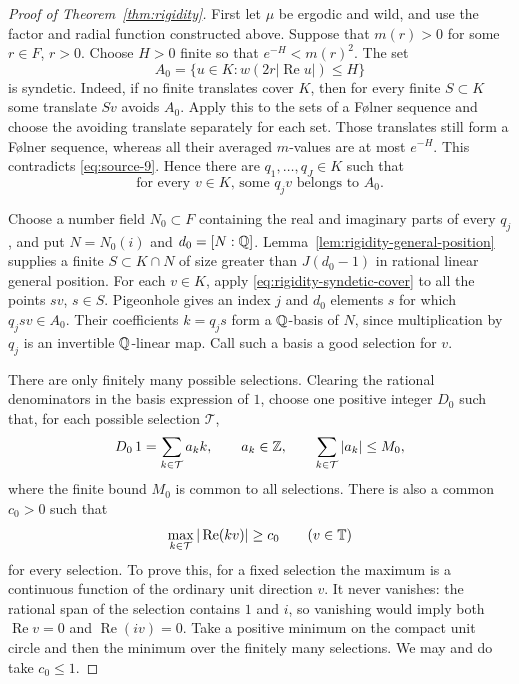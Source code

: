 \begin{proof}[Proof of Theorem~\ref{thm:rigidity}]
First let $\mu$ be ergodic and wild, and use the factor and radial
function constructed above.  Suppose that $m(r)>0$ for some $r\in F$,
$r>0$.  Choose $H>0$ finite so that $e^{-H}<m(r)^2$.  The set
\[
 A_0=\{u\in K:w(2r|\operatorname{Re}u|)\leq H\}
\]
is syndetic.  Indeed, if no finite translates cover $K$, then for every
finite $S\subset K$ some translate $Sv$ avoids $A_0$.  Apply this to
the sets of a F\o lner sequence and choose the avoiding translate
separately for each set.  Those translates still form a F\o lner
sequence, whereas all their averaged $m$-values are at most $e^{-H}$.
This contradicts \eqref{eq:source-9}.  Hence there are
$q_1,\ldots,q_J\in K$ such that
\begin{equation}\label{eq:rigidity-syndetic-cover}
 \text{for every }v\in K\text{, some }q_jv\text{ belongs to }A_0.
\end{equation}

Choose a number field $N_0\subset F$ containing the real and imaginary
parts of every $q_j$, and put $N=N_0(i)$ and $d_0=[N:\mathbb Q]$.
Lemma~\ref{lem:rigidity-general-position} supplies a finite
$S\subset K\cap N$ of size greater than $J(d_0-1)$ in rational linear
general position.  For each $v\in K$, apply
\eqref{eq:rigidity-syndetic-cover} to all the points $sv$, $s\in S$.
Pigeonhole gives an index $j$ and $d_0$ elements $s$ for which
$q_jsv\in A_0$.  Their coefficients $k=q_js$ form a $\mathbb Q$-basis of $N$,
since multiplication by $q_j$ is an invertible $\mathbb Q$-linear map.
Call such a basis a good selection for $v$.

There are only finitely many possible selections.  Clearing the rational
denominators in the basis expression of $1$, choose one positive integer
$D_0$ such that, for each possible selection $\mathcal T$,
\begin{equation}\label{eq:rigidity-integer-selection}
 D_0\,1=\sum_{k\in\mathcal T}a_k k,
 \qquad a_k\in\mathbb Z,\qquad
 \sum_{k\in\mathcal T}|a_k|\leq M_0,
\end{equation}
where the finite bound $M_0$ is common to all selections.  There is also
a common $c_0>0$ such that
\begin{equation}\label{eq:rigidity-selection-transversality}
 \max_{k\in\mathcal T}|\operatorname{Re}(kv)|\geq c_0
 \qquad(v\in\mathbb T)
\end{equation}
for every selection.  To prove this, for a fixed selection the maximum
is a continuous function of the ordinary unit direction $v$.  It never
vanishes: the rational span of the selection contains $1$ and $i$, so
vanishing would imply both $\operatorname{Re}v=0$ and
$\operatorname{Re}(iv)=0$.  Take a positive minimum on the compact unit
circle and then the minimum over the finitely many selections.  We may
and do take $c_0\leq1$.


\end{proof}
